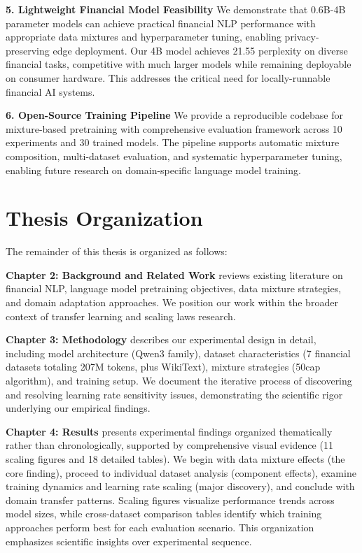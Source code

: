 \textbf{5. Lightweight Financial Model Feasibility}
We demonstrate that 0.6B-4B parameter models can achieve practical financial NLP performance with appropriate data mixtures and hyperparameter tuning, enabling privacy-preserving edge deployment. Our 4B model achieves 21.55 perplexity on diverse financial tasks, competitive with much larger models while remaining deployable on consumer hardware. This addresses the critical need for locally-runnable financial AI systems.

\textbf{6. Open-Source Training Pipeline}
We provide a reproducible codebase for mixture-based pretraining with comprehensive evaluation framework across 10 experiments and 30 trained models. The pipeline supports automatic mixture composition, multi-dataset evaluation, and systematic hyperparameter tuning, enabling future research on domain-specific language model training.

\section{Thesis Organization}

The remainder of this thesis is organized as follows:

\textbf{Chapter 2: Background and Related Work} reviews existing literature on financial NLP, language model pretraining objectives, data mixture strategies, and domain adaptation approaches. We position our work within the broader context of transfer learning and scaling laws research.

\textbf{Chapter 3: Methodology} describes our experimental design in detail, including model architecture (Qwen3 family), dataset characteristics (7 financial datasets totaling 207M tokens, plus WikiText), mixture strategies (50cap algorithm), and training setup. We document the iterative process of discovering and resolving learning rate sensitivity issues, demonstrating the scientific rigor underlying our empirical findings.

\textbf{Chapter 4: Results} presents experimental findings organized thematically rather than chronologically, supported by comprehensive visual evidence (11 scaling figures and 18 detailed tables). We begin with data mixture effects (the core finding), proceed to individual dataset analysis (component effects), examine training dynamics and learning rate scaling (major discovery), and conclude with domain transfer patterns. Scaling figures visualize performance trends across model sizes, while cross-dataset comparison tables identify which training approaches perform best for each evaluation scenario. This organization emphasizes scientific insights over experimental sequence.

